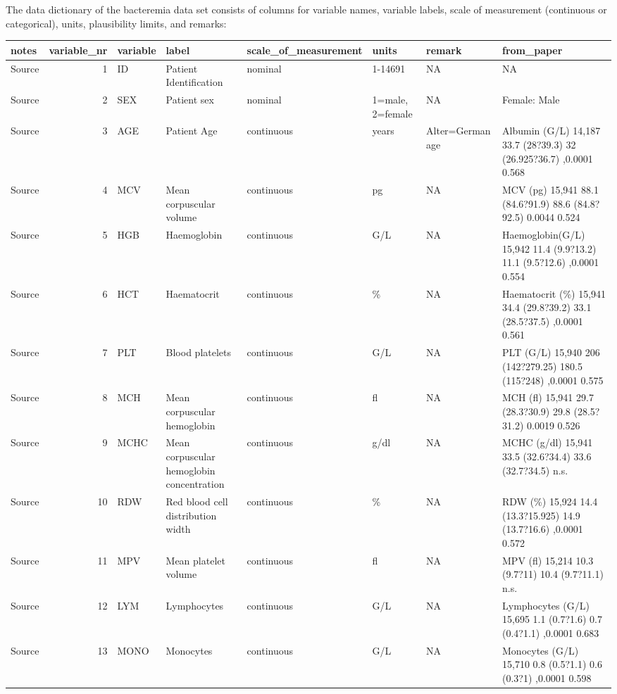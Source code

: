 \documentclass[
  letterpaper,
  DIV=11,
  numbers=noendperiod]{scrreport}
\begin{document}
The data dictionary of the bacteremia data set consists of columns for
variable names, variable labels, scale of measurement (continuous or
categorical), units, plausibility limits, and remarks:

\captionsetup[table]{labelformat=empty,skip=1pt}
\begin{longtable}{lrllllll}
\toprule
notes & variable\_nr & variable & label & scale\_of\_measurement & units & remark & from\_paper \\ 
\midrule
Source & 1 & ID & Patient Identification & nominal & 1-14691 & NA & NA \\ 
Source & 2 & SEX & Patient sex & nominal & 1=male, 2=female & NA & Female: Male \\ 
Source & 3 & AGE & Patient Age & continuous & years & Alter=German age & Albumin (G/L) 14,187 33.7 (28?39.3) 32 (26.925?36.7) ,0.0001 0.568 \\ 
Source & 4 & MCV & Mean corpuscular volume & continuous & pg & NA & MCV (pg) 15,941 88.1 (84.6?91.9) 88.6 (84.8?92.5) 0.0044 0.524 \\ 
Source & 5 & HGB & Haemoglobin & continuous & G/L & NA & Haemoglobin(G/L) 15,942 11.4 (9.9?13.2) 11.1 (9.5?12.6) ,0.0001 0.554 \\ 
Source & 6 & HCT & Haematocrit & continuous & \% & NA & Haematocrit (\%) 15,941 34.4 (29.8?39.2) 33.1 (28.5?37.5) ,0.0001 0.561 \\ 
Source & 7 & PLT & Blood platelets & continuous & G/L & NA & PLT (G/L) 15,940 206 (142?279.25) 180.5 (115?248) ,0.0001 0.575 \\ 
Source & 8 & MCH & Mean corpuscular hemoglobin & continuous & fl & NA & MCH (fl) 15,941 29.7 (28.3?30.9) 29.8 (28.5?31.2) 0.0019 0.526 \\ 
Source & 9 & MCHC & Mean corpuscular hemoglobin concentration & continuous & g/dl & NA & MCHC (g/dl) 15,941 33.5 (32.6?34.4) 33.6 (32.7?34.5) n.s. \\ 
Source & 10 & RDW & Red blood cell distribution width & continuous & \% & NA & RDW (\%) 15,924 14.4 (13.3?15.925) 14.9 (13.7?16.6) ,0.0001 0.572 \\ 
Source & 11 & MPV & Mean platelet volume & continuous & fl & NA & MPV (fl) 15,214 10.3 (9.7?11) 10.4 (9.7?11.1) n.s. \\ 
Source & 12 & LYM & Lymphocytes & continuous & G/L & NA & Lymphocytes (G/L) 15,695 1.1 (0.7?1.6) 0.7 (0.4?1.1) ,0.0001 0.683 \\ 
Source & 13 & MONO & Monocytes & continuous & G/L & NA & Monocytes (G/L) 15,710 0.8 (0.5?1.1) 0.6 (0.3?1) ,0.0001 0.598 \\ 

\end{longtable}
\end{document}
